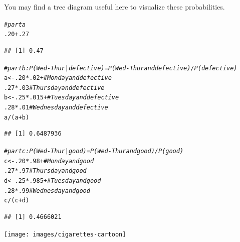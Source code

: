 \documentclass[twoside]{book}\usepackage[]{graphicx}\usepackage[]{xcolor}
\makeatletter
\newcommand{\hlnum}[1]{\textcolor[rgb]{0.686,0.059,0.569}{#1}}%
\newcommand{\hlcom}[1]{\textcolor[rgb]{0.678,0.584,0.686}{\textit{#1}}}%
\newcommand{\hlopt}[1]{\textcolor[rgb]{0,0,0}{#1}}%
\newcommand{\hlstd}[1]{\textcolor[rgb]{0.345,0.345,0.345}{#1}}%
\newcommand{\hlkwb}[1]{\textcolor[rgb]{0.69,0.353,0.396}{#1}}%
\newenvironment{kframe}{%
 \def\at@end@of@kframe{}%
 \ifinner\ifhmode%
  \def\at@end@of@kframe{\end{minipage}}%
  \begin{minipage}{\columnwidth}%
 \fi\fi%
 \def\FrameCommand##1{\hskip\@totalleftmargin \hskip-\fboxsep
 \colorbox{shadecolor}{##1}\hskip-\fboxsep
     \hskip-\linewidth \hskip-\@totalleftmargin \hskip\columnwidth}%
 \MakeFramed {\advance\hsize-\width
   \@totalleftmargin\z@ \linewidth\hsize
   \@setminipage}}%
 {\par\unskip\endMakeFramed%
 \at@end@of@kframe}
\newenvironment{knitrout}{}{} %
\newif\ifsolutions
\newif\ifsolutionslocal
\makeatother
\begin{document}
\begin{solution}
You may find a tree diagram useful here to visualize these probabilities.
\begin{knitrout}
\color{fgcolor}\begin{kframe}
\begin{alltt}
\hlcom{# part a}
\hlnum{.20} \hlopt{+} \hlnum{.27}
\end{alltt}
\begin{verbatim}
## [1] 0.47
\end{verbatim}
\begin{alltt}
\hlcom{# part b: P( Wed-Thur | defective ) = P( Wed-Thur and defective ) / P(defective)}
\hlstd{a} \hlkwb{<-} \hlnum{.20} \hlopt{*} \hlnum{.02} \hlopt{+}       \hlcom{# Monday and defective}
     \hlnum{.27} \hlopt{*} \hlnum{.03}         \hlcom{# Thursday and defective}
\hlstd{b} \hlkwb{<-} \hlnum{.25} \hlopt{*} \hlnum{.015} \hlopt{+}      \hlcom{# Tuesday and defective}
     \hlnum{.28} \hlopt{*} \hlnum{.01}         \hlcom{# Wednesday and defective }
\hlstd{a} \hlopt{/} \hlstd{(a} \hlopt{+} \hlstd{b)}
\end{alltt}
\begin{verbatim}
## [1] 0.6487936
\end{verbatim}
\begin{alltt}
\hlcom{# part c: P( Wed-Thur | good ) = P( Wed-Thur and good ) / P(good)}
\hlstd{c} \hlkwb{<-} \hlnum{.20} \hlopt{*} \hlnum{.98} \hlopt{+}       \hlcom{# Monday and good}
     \hlnum{.27} \hlopt{*} \hlnum{.97}         \hlcom{# Thursday and good}
\hlstd{d} \hlkwb{<-} \hlnum{.25} \hlopt{*} \hlnum{.985} \hlopt{+}      \hlcom{# Tuesday and good}
     \hlnum{.28} \hlopt{*} \hlnum{.99}         \hlcom{# Wednesday and good }
\hlstd{c} \hlopt{/} \hlstd{(c} \hlopt{+} \hlstd{d)}
\end{alltt}
\begin{verbatim}
## [1] 0.4666021
\end{verbatim}
\end{kframe}
\end{knitrout}
\end{solution}


\shipoutProblems

\vfill

\begin{center}
	\texttt{[image: images/cigarettes-cartoon]}
\end{center}

\ifsolutions
\ifsolutionslocal
\newpage
\section*{Solutions}
\shipoutSolutions
\fi
\fi
 
\end{document}
